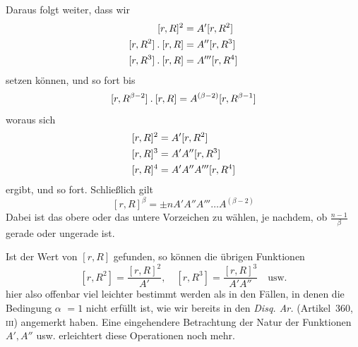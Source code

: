 Daraus folgt weiter, dass wir
\[
\begin{aligned}
\relax[r,R]^2&=A'[r,R^2]\\
\relax[r,R^2]\mathbin{.}[r,R]&=A''[r,R^3]\\
\relax[r,R^3]\mathbin{.}[r,R]&=A'''[r,R^4]
\end{aligned}
\]
setzen können, und so fort bis
\[
[r,R^{\beta-2}]\mathbin{.}[r,R]=A^{(\beta-2)}[r,R^{\beta-1}]
\]
woraus sich
\[
\begin{aligned}
\relax[r,R]^2&=A'[r,R^2]\\
\relax[r,R]^3&=A'A''[r,R^3]\\
\relax[r,R]^4&=A'A''A'''[r,R^4]
\end{aligned}
\]
ergibt, und so fort. Schließlich gilt
\[
[r,R]^\beta=\pm nA'A''A'''\dots A^{(\beta-2)}
\]
Dabei ist das obere oder das untere Vorzeichen zu wählen, je nachdem, ob $\frac{n-1}\beta$ gerade oder ungerade ist.

Ist der Wert von $[r,R]$ gefunden, so können die übrigen Funktionen
\[
[r,R^2]=\frac{[r,R]^2}{A'},\quad[r,R^3]=\frac{[r,R]^3}{A'A''}\quad\text{usw.}
\]
hier also offenbar viel leichter bestimmt werden als in den Fällen, in denen die Bedingung $\alpha$ $=1$ nicht erfüllt ist,
wie wir bereits in den \emph{Disq. Ar.} (Artikel~360, \textsc{iii}) angemerkt haben. Eine eingehendere Betrachtung der Natur der Funktionen $A',A''$ usw. erleichtert diese Operationen noch mehr.

